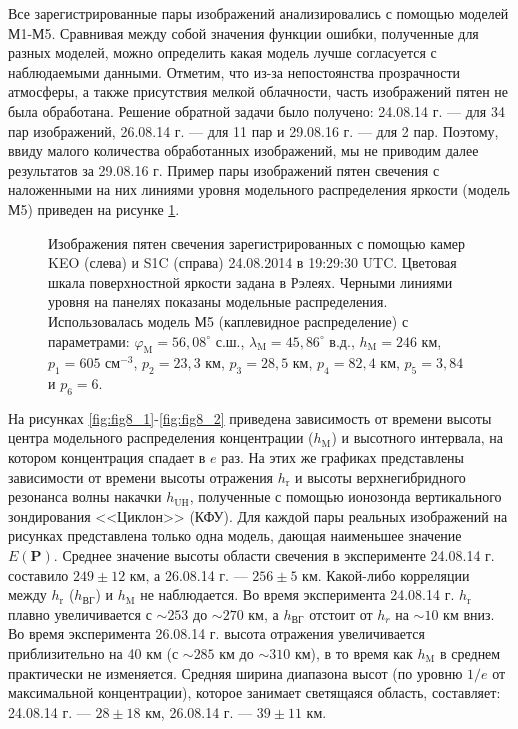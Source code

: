 \documentclass[12pt,a4paper]{article}
\renewcommand{\vec}{\mathbf}
\begin{document}
Все зарегистрированные пары изображений анализировались с помощью моделей М1-М5. Сравнивая между собой значения функции ошибки, полученные для разных моделей, можно определить какая модель лучше согласуется с наблюдаемыми данными. Отметим, что из-за непостоянства прозрачности атмосферы, а также присутствия мелкой облачности, часть изображений пятен не была обработана. Решение обратной задачи было получено: 24.08.14 г. --- для 34 пар изображений, 26.08.14 г. --- для 11 пар и 29.08.16 г. --- для 2 пар. Поэтому, ввиду малого количества обработанных изображений, мы не приводим далее результатов за 29.08.16 г. Пример пары изображений пятен свечения с наложенными на них линиями уровня модельного распределения яркости (модель М5) приведен на рисунке \ref{fig:fig7}.
\begin{figure}[h]
	\caption{Изображения пятен свечения зарегистрированных с помощью камер KEO (слева) и S1C (справа) 24.08.2014 в 19:29:30 UTC. Цветовая шкала поверхностной яркости задана в Рэлеях. Черными линиями уровня на панелях показаны модельные распределения. Использовалась модель М5 (каплевидное распределение) с параметрами: $\varphi_\text{M}=56,08^\circ$ с.ш., $\lambda_\text{M}=45,86^\circ$ в.д., $h_\text{M}=246$ км, $p_1=605$ см$^{-3}$, $p_2=23,3$ км, $p_3=28,5$ км, $p_4=82,4$ км, $p_5=3,84$ и $p_6=6$.}
	\label{fig:fig7}
\end{figure}
На рисунках \ref{fig:fig8_1}-\ref{fig:fig8_2} приведена зависимость от времени высоты центра модельного распределения концентрации ($h_\text{M}$) и высотного интервала, на котором концентрация спадает в $e$ раз. На этих же графиках представлены зависимости от времени высоты отражения $h_\text{r}$ и высоты верхнегибридного резонанса волны накачки $h_\text{UH}$, полученные с помощью ионозонда вертикального зондирования <<Циклон>> (КФУ). Для каждой пары реальных изображений на рисунках представлена только одна модель, дающая наименьшее значение $E(\vec{P})$. Среднее значение высоты области свечения в эксперименте 24.08.14 г. составило $249\pm12$ км, а 26.08.14 г. --- $256\pm5$ км. Какой-либо корреляции между $h_\text{r}$ ($h_\text{ВГ}$) и $h_\text{M}$ не наблюдается. Во время эксперимента 24.08.14 г. $h_\text{r}$ плавно увеличивается с $\sim253$ до $\sim270$ км, а $h_\text{ВГ}$ отстоит от $h_r$ на $\sim10$ км вниз.
Во время эксперимента 26.08.14 г. высота отражения увеличивается приблизительно на 40 км (с $\sim285$ км до $\sim310$ км), в то время как $h_\text{M}$ в среднем практически не изменяется. Средняя ширина диапазона высот (по уровню $1/e$ от максимальной концентрации), которое занимает светящаяся область, составляет: 24.08.14 г. --- $28\pm18$ км, 26.08.14 г. --- $39\pm 11$ км. 
\end{document}
